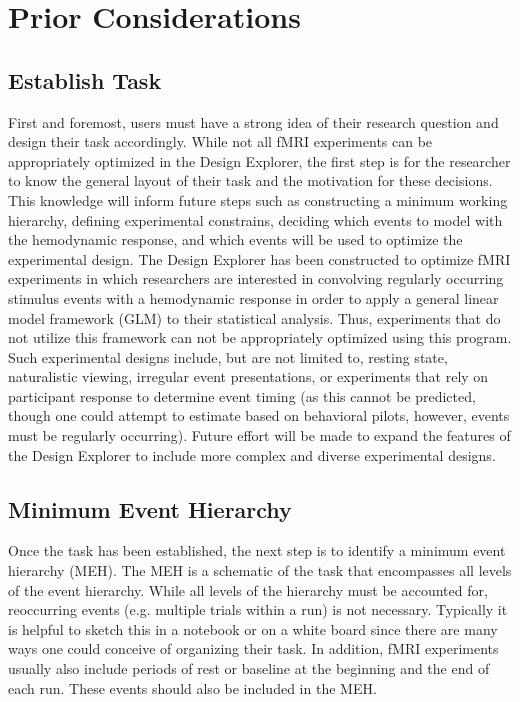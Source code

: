 \documentclass[10pt]{article}
\begin{document}

\newpage
\section{Prior Considerations}
\label{sec:considerations}
	\subsection{Establish Task}
	\label{subsec:establish}
		First and foremost, users must have a strong idea of their research question and design their task accordingly.
		While not all fMRI experiments can be appropriately optimized in the Design Explorer, the first step is for the researcher to know the general layout of their task and the motivation for these decisions.
		This knowledge will inform future steps such as constructing a minimum working hierarchy, defining experimental constrains, deciding which events to model with the hemodynamic response, and which events will be used to optimize the experimental design.
		The Design Explorer has been constructed to optimize fMRI experiments in which researchers are interested in convolving regularly occurring stimulus events with a hemodynamic response in order to apply a general linear model framework (GLM) to their statistical analysis.
		Thus, experiments that do not utilize this framework can not be appropriately optimized using this program.
		Such experimental designs include, but are not limited to, resting state, naturalistic viewing, irregular event presentations, or experiments that rely on participant response to determine event timing (as this cannot be predicted, though one could attempt to estimate based on behavioral pilots, however, events must be regularly occurring).
		Future effort will be made to expand the features of the Design Explorer to include more complex and diverse experimental designs.

	\subsection{Minimum Event Hierarchy}
	\label{subsec:sketch}
		Once the task has been established, the next step is to identify a minimum event hierarchy (MEH).
		The MEH is a schematic of the task that encompasses all levels of the event hierarchy.
		While all levels of the hierarchy must be accounted for, reoccurring events (e.g. multiple trials within a run) is not necessary.
		Typically it is helpful to sketch this in a notebook or on a white board since there are many ways one could conceive of organizing their task.
		In addition, fMRI experiments usually also include periods of rest or baseline at the beginning and the end of each run.
		These events should also be included in the MEH.
\end{document}
